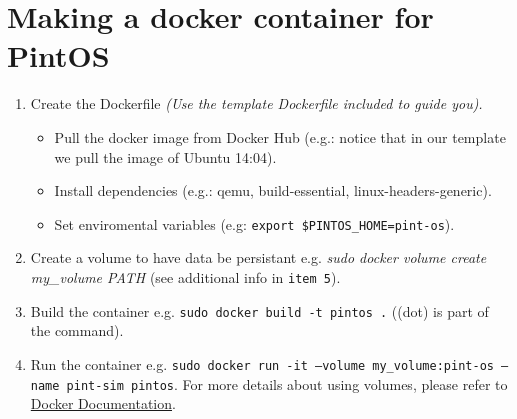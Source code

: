 \documentclass[12pt]{article}
\begin{document}
\maketitle

\section{Making a docker container for PintOS}

\begin{enumerate}
	\item Create the Dockerfile \textit{(Use the template Dockerfile included to guide you).}
	\begin{itemize}
		\item Pull the docker image from Docker Hub (e.g.: notice that in our template we pull the image of Ubuntu 14:04).
		\item Install dependencies (e.g.: qemu, build-essential, linux-headers-generic).
		\item Set enviromental variables (e.g: \texttt{export \$PINTOS\_HOME=\/pint-os\/}).
	\end{itemize}
	\item Create a volume to have data be persistant e.g. \textit{sudo docker volume create my\_volume PATH} (see additional info in \texttt{item 5}).
	
	\item Build the container e.g. \texttt{sudo docker build -t pintos .} ((dot) is part of the command).
	\item Run the container e.g. \texttt{sudo docker run -it --volume my\_volume:\/pint-os --name pint-sim pintos}. For more details about using volumes, please refer to \href{https://docs.docker.com/storage/volumes/}{Docker Documentation}.
	
\end{enumerate}
\end{document}
